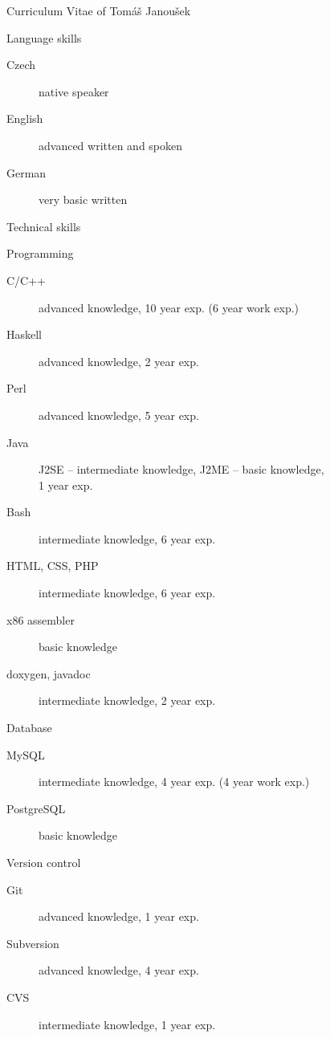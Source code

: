 \documentclass[12pt,a4paper,english,pdftex]{article}
\begin{document}
\begin{cv}{Curriculum Vitae of Tomáš Janoušek}
    \begin{cvlist}{Language skills}
        \item
        \begin{description}
        \item[Czech] native speaker
        \item[English] advanced written and spoken
        \item[German] very basic written
        \end{description}
    \end{cvlist}

    \begin{cvlist}{Technical skills}
        \item[Programming]
            \begin{description}
                \item[C/C++] advanced knowledge, 10 year exp. (6 year
                work exp.)
                \item[Haskell] advanced knowledge, 2 year exp.
                \item[Perl] advanced knowledge, 5 year exp.
                \item[Java] J2SE -- intermediate knowledge, J2ME -- basic
                knowledge, \\ 1 year exp.
                \item[Bash] intermediate knowledge, 6 year exp.
                \item[HTML, CSS, PHP] intermediate knowledge, 6 year exp.
                \item[x86 assembler] basic knowledge
                \item[doxygen, javadoc] intermediate knowledge, 2 year exp.
            \end{description}

        \item[Database]
            \begin{description}
                \item[MySQL] intermediate knowledge, 4 year exp. (4 year work
                exp.)
                \item[PostgreSQL] basic knowledge
            \end{description}

        \item[Version control]
            \begin{description}
		\item[Git] advanced knowledge, 1 year exp.
                \item[Subversion] advanced knowledge, 4 year exp.
                \item[CVS] intermediate knowledge, 1 year exp.
            \end{description}


\end{cvlist}
\end{cv}
\end{document}
